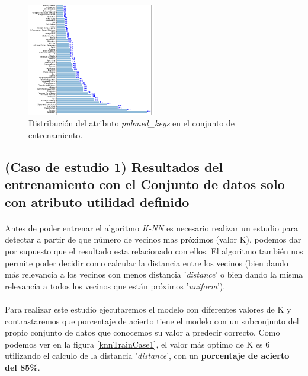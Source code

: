 \begin{figure}[!htb]
  \centering
    \includegraphics[width=0.5\textwidth]{images/resultados_knn_keywords.png}
    \caption{Distribución del atributo \textit{pubmed\_keys} en el conjunto de entrenamiento.}
  \label{knnDistKeywords}
\end{figure}

\subsection{(Caso de estudio 1) Resultados del entrenamiento con el Conjunto de datos solo con atributo utilidad definido }

\paragraph{}
Antes de poder entrenar el algoritmo \textit{K-NN} es necesario realizar un estudio para detectar a partir de que número de vecinos mas próximos (valor K), podemos dar por supuesto que el resultado esta relacionado con ellos. El algoritmo también nos permite poder decidir como calcular la distancia entre los vecinos (bien dando más relevancia a los vecinos con menos distancia '\textit{distance}'\cite{ref:knn_doc} o bien dando la misma relevancia a todos los vecinos que están próximos '\textit{uniform}'\cite{ref:knn_doc}).

\paragraph{}
Para realizar este estudio ejecutaremos el modelo con diferentes valores de K y contrastaremos que porcentaje de acierto tiene el modelo con un subconjunto del propio conjunto de datos que conocemos su valor a predecir correcto. Como podemos ver en la figura \ref{knnTrainCase1}, el valor más optimo de K es 6 utilizando el calculo de la distancia '\textit{distance}', con un \textbf{porcentaje de acierto del 85\%}.

